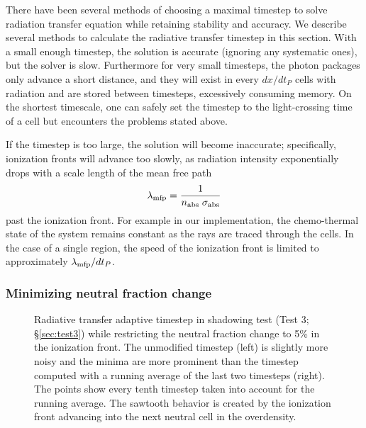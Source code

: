 \documentclass[useAMS,usenatbib]{mn2e}
\begin{document}
There have been several methods of choosing a maximal timestep to
solve radiation transfer equation while retaining stability and
accuracy.  We describe several methods to calculate the radiative
transfer timestep in this section.  With a small enough timestep, the
solution is accurate (ignoring any systematic ones), but the solver is
slow.  Furthermore for very small timesteps, the photon packages only
advance a short distance, and they will exist in every $dx/dt_P$ cells
with radiation and are stored between timesteps, excessively consuming
memory.  On the shortest timescale, one can safely set the timestep to
the light-crossing time of a cell \citep{Abel99_RT, Trac07} but
encounters the problems stated above.

If the timestep is too large, the solution will become inaccurate;
specifically, ionization fronts will advance too slowly, as radiation
intensity exponentially drops with a scale length of the mean free
path
\begin{equation}
  \label{eqn:mfp}
  \lambda_{\rm mfp} = \frac{1}{n_{\rm abs} \; \sigma_{\rm abs}}
\end{equation}
past the ionization front.  For example in our implementation, the
chemo-thermal state of the system remains constant as the rays are
traced through the cells.  In the case of a single \hii region,
the speed of the ionization front is limited to approximately
$\lambda_{\rm mfp} / dt_P$.

\subsubsection{Minimizing neutral fraction change}
\label{sec:dt_hi}

\begin{figure*}
  \caption{\label{fig:dtsmooth} Radiative transfer adaptive timestep
    in shadowing test (Test 3; \S\ref{sec:test3}) while restricting
    the neutral fraction change to 5\% in the ionization front.  The
    unmodified timestep (left) is slightly more noisy and the minima
    are more prominent than the timestep computed with a running
    average of the last two timesteps (right).  The points show every
    tenth timestep taken into account for the running average.  The
    sawtooth behavior is created by the ionization front advancing
    into the next neutral cell in the overdensity.}
\end{figure*}
\end{document}
